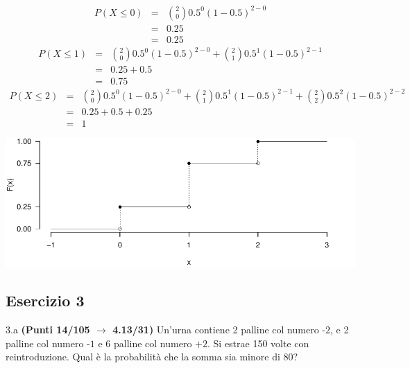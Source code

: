 \documentclass[
  11pt,
]{book}
\theoremstyle{mytheoremstyle}
\theoremstyle{mydefstyle}
\newenvironment{sol}
  {
  \begin{tcolorbox}[enhanced,breakable,arc=0.1mm,boxrule=1pt,colback=white,colframe=iblue,
  title=\bf \fontfamily{lmss}\selectfont \hspace{.5 cm} Soluzione,drop fuzzy shadow]

}{
\end{tcolorbox}
  }
\begin{document}
\begin{sol}

\normalsize 
\begin{eqnarray*}
      P( X \leq 0 ) &=& \binom{ 2 }{ 0 } 0.5 ^{ 0 }(1- 0.5 )^{ 2 - 0 } \\                 &=& 0.25 \\                 &=& 0.25 
   \end{eqnarray*}
\normalsize  \normalsize 
\begin{eqnarray*}
      P( X \leq 1 ) &=& \binom{ 2 }{ 0 } 0.5 ^{ 0 }(1- 0.5 )^{ 2 - 0 }+\binom{ 2 }{ 1 } 0.5 ^{ 1 }(1- 0.5 )^{ 2 - 1 } \\                 &=& 0.25+0.5 \\                 &=& 0.75 
   \end{eqnarray*}
\normalsize  \normalsize 
\begin{eqnarray*}
      P( X \leq 2 ) &=& \binom{ 2 }{ 0 } 0.5 ^{ 0 }(1- 0.5 )^{ 2 - 0 }+\binom{ 2 }{ 1 } 0.5 ^{ 1 }(1- 0.5 )^{ 2 - 1 }+\binom{ 2 }{ 2 } 0.5 ^{ 2 }(1- 0.5 )^{ 2 - 2 } \\                 &=& 0.25+0.5+0.25 \\                 &=& 1 
   \end{eqnarray*}
\normalsize 

\begin{center}\includegraphics{Esami_passati_con_soluzioni_files/figure-latex/2024-126-1} \end{center}

\end{sol}

\subsection{Esercizio 3}\label{esercizio-3-41}

3.a \textbf{(Punti 14/105 \(\rightarrow\) 4.13/31)} Un'urna contiene 2 palline col numero \(\mbox{-2}\), e 2 palline col numero \(\mbox{-1}\) e 6 palline col numero \(\mbox{+2}\).
Si estrae 150 volte con reintroduzione.
Qual è la probabilità che la somma sia minore di 80?
\end{document}
